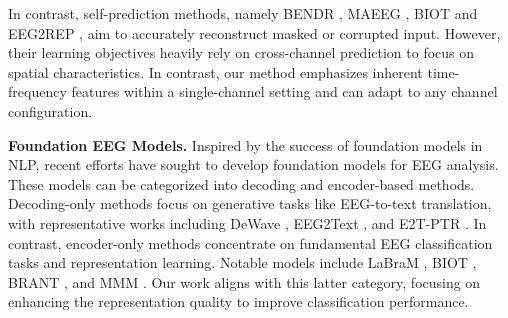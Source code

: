 In contrast, self-prediction methods, namely BENDR \cite{kostas2021bendr}, MAEEG \cite{chien2022maeeg}, BIOT \cite{yang2024biot} and EEG2REP \cite{mohammadi2024eeg2rep},  aim to accurately reconstruct masked or corrupted input.
However, their learning objectives heavily rely on cross-channel prediction to focus on spatial characteristics.
In contrast, our method emphasizes inherent time-frequency features within a single-channel setting and can adapt to any channel configuration.






   
\noindent\textbf{Foundation EEG Models. }
Inspired by the success of foundation models in NLP, recent efforts have sought to develop foundation models for EEG analysis. 
These models can be categorized into decoding and encoder-based methods. 
Decoding-only methods focus on generative tasks like EEG-to-text translation, with representative works including DeWave \cite{duan2023dewave}, EEG2Text \cite{liu2024eeg2text}, and E2T-PTR \cite{wang2024enhancing}.
In contrast, encoder-only methods concentrate on fundamental EEG classification tasks and representation learning. 
Notable models include LaBraM \cite{jiang2024large}, BIOT \cite{yang2024biot}, BRANT \cite{zhang2024brant}, and MMM \cite{yi2024learning}.
Our work aligns with this latter category, focusing on enhancing the representation quality to improve classification performance. 


